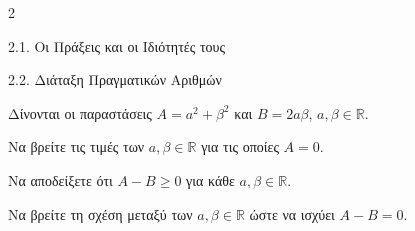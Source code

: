 \begin{ylh}{2}
    \item 2.1. Οι Πράξεις και οι Ιδιότητές τους
    \item 2.2. Διάταξη Πραγματικών Αριθμών
\end{ylh}
Δίνονται οι παραστάσεις $A = a^{2} + \beta^{2}$ και $B = 2a\beta$, $a,\beta \in \mathbb{R}$.
\begin{alist}
\item Να βρείτε τις τιμές των $a,\beta \in \mathbb{R}$ για τις οποίες $A = 0$.
\item Να αποδείξετε ότι $A-B \geq 0$ για κάθε $a,\beta \in \mathbb{R}$.
\item Να βρείτε τη σχέση μεταξύ των $a,\beta \in \mathbb{R}$ ώστε να ισχύει $A-B= 0$.
\end{alist}


